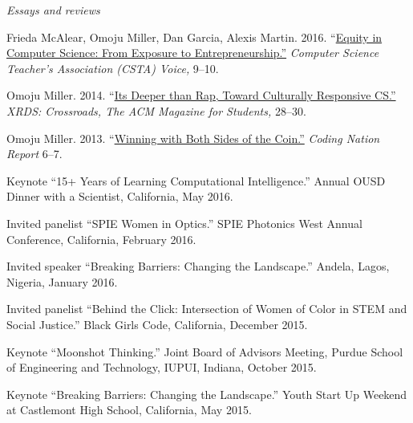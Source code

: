 \documentclass[11pt,article,oneside]{memoir}
\begin{document}
\bigskip
\noindent\emph{Essays and reviews \vspace{0.05in}}



\ind Frieda McAlear, Omoju Miller, Dan Garcia, Alexis Martin. 2016. ``\href{http://www.csta.acm.org/Communications/sub/CSTAVoice_Files/csta_voice_01_2016.pdf}{Equity in Computer Science: From Exposure to Entrepreneurship.''} \emph{Computer Science Teacher's Association (CSTA) Voice, } 9--10. 

\ind Omoju Miller. 2014. ``\href{http://dl.acm.org/citation.cfm?id=2604994}{Its Deeper than Rap, Toward Culturally Responsive CS.'' }\emph{XRDS: Crossroads,  The ACM Magazine for Students, } 28--30. 

\ind Omoju Miller. 2013. ``\href{http://kaporcenter.org/wp-content/uploads/2013/10/Kapor_CodingLandscape_R3.pdf}{Winning with Both Sides of the Coin.''} \emph{Coding Nation Report} 6--7. 
 
 \bigskip


\medskip

\ind Keynote ``15+ Years of Learning Computational Intelligence.'' Annual OUSD Dinner with a Scientist, California, May 2016. 

\ind Invited panelist ``SPIE Women in Optics.'' SPIE Photonics West Annual Conference, California, February 2016. 

\ind Invited speaker ``Breaking Barriers: Changing the Landscape.'' Andela, Lagos, Nigeria, January 2016. 

\ind Invited panelist ``Behind the Click: Intersection of Women of Color in STEM and Social Justice.'' Black Girls Code, California, December 2015.

\ind Keynote ``Moonshot Thinking.'' Joint Board of Advisors Meeting, Purdue School of Engineering and Technology, IUPUI, Indiana, October 2015.

\ind Keynote ``Breaking Barriers: Changing the Landscape.'' Youth Start Up Weekend at Castlemont High School, California, May 2015. 
\end{document}
